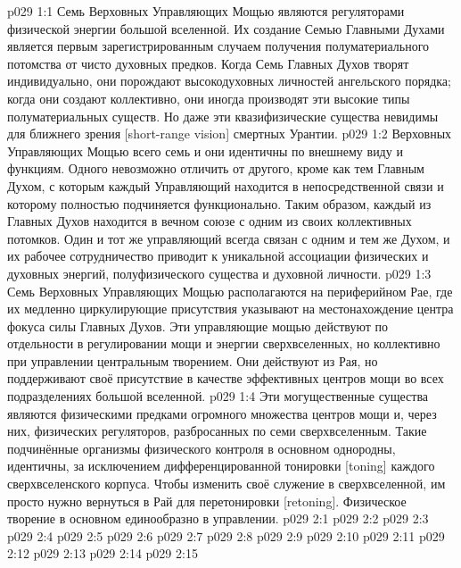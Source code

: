 \vs p029 1:1 Семь Верховных Управляющих Мощью являются регуляторами физической энергии большой вселенной. Их создание Семью Главными Духами является первым зарегистрированным случаем получения полуматериального потомства от чисто духовных предков. Когда Семь Главных Духов творят индивидуально, они порождают высокодуховных личностей ангельского порядка; когда они создают коллективно, они иногда производят эти высокие типы полуматериальных существ. Но даже эти квазифизические существа невидимы для ближнего зрения [short\hyp{}range vision] смертных Урантии.
\vs p029 1:2 Верховных Управляющих Мощью всего семь и они идентичны по внешнему виду и функциям. Одного невозможно отличить от другого, кроме как тем Главным Духом, с которым каждый Управляющий находится в непосредственной связи и которому полностью подчиняется функционально. Таким образом, каждый из Главных Духов находится в вечном союзе с одним из своих коллективных потомков. Один и тот же управляющий всегда связан с одним и тем же Духом, и их рабочее сотрудничество приводит к уникальной ассоциации физических и духовных энергий, полуфизического существа и духовной личности.
\vs p029 1:3 Семь Верховных Управляющих Мощью располагаются на периферийном Рае, где их медленно циркулирующие присутствия указывают на местонахождение центра фокуса силы Главных Духов. Эти управляющие мощью действуют по отдельности в регулировании мощи и энергии сверхвселенных, но коллективно при управлении центральным творением. Они действуют из Рая, но поддерживают своё присутствие в качестве эффективных центров мощи во всех подразделениях большой вселенной.
\vs p029 1:4 Эти могущественные существа являются физическими предками огромного множества центров мощи и, через них, физических регуляторов, разбросанных по семи сверхвселенным. Такие подчинённые организмы физического контроля в основном однородны, идентичны, за исключением дифференцированной тонировки [toning] каждого сверхвселенского корпуса. Чтобы изменить своё служение в сверхвселенной, им просто нужно вернуться в Рай для перетонировки [retoning]. Физическое творение в основном единообразно в управлении.
\vs p029 2:1 
\vs p029 2:2 
\vs p029 2:3 
\vs p029 2:4 
\vs p029 2:5 
\vs p029 2:6 
\vs p029 2:7 
\vs p029 2:8 
\vs p029 2:9 \pc 
\vs p029 2:10 
\vs p029 2:11 
\vs p029 2:12 
\vs p029 2:13 
\vs p029 2:14 
\vs p029 2:15 
